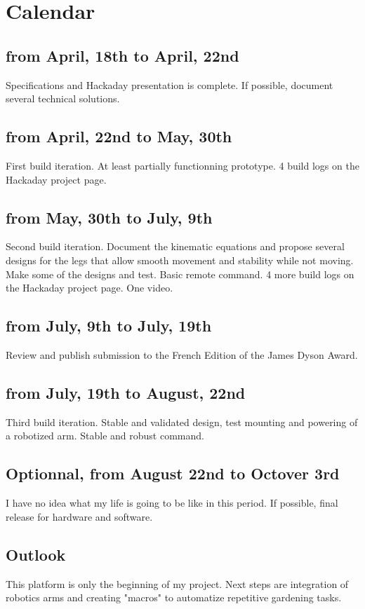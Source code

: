 \chapter{Calendar}

    \section{from April, 18th to April, 22nd}
    
    Specifications and Hackaday presentation is complete.
    If possible, document several technical solutions.
    
    \section{from April, 22nd to May, 30th}
    
    First build iteration. At least partially functionning prototype. 
    4 build logs on the Hackaday project page.

    \section{from May, 30th to July, 9th}
    
    Second build iteration.
    Document the kinematic equations and propose several designs for the legs that allow smooth movement and stability while not moving.
    Make some of the designs and test.
    Basic remote command.
    4 more build logs on the Hackaday project page.
    One video.
    
    \section{from July, 9th to July, 19th}
    
    Review and publish submission to the French Edition of the James Dyson Award.
    
    \section{from July, 19th to August, 22nd}
    
    Third build iteration.
    Stable and validated design, test mounting and powering of a robotized arm.
    Stable and robust command.

    \section{Optionnal, from August 22nd to Octover 3rd}

    I have no idea what my life is going to be like in this period.
    If possible, final release for hardware and software.

    \section{Outlook}
    
    This platform is only the beginning of my project. Next steps are integration of robotics arms and creating "macros" to automatize repetitive gardening tasks.